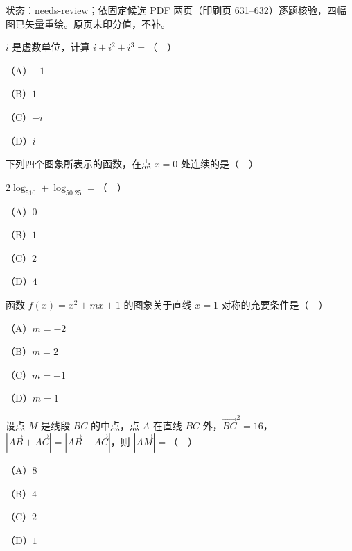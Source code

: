 

状态：needs-review；依固定候选 PDF 两页（印刷页 631–632）逐题核验，四幅图已矢量重绘。原页未印分值，不补。


\begin{question}
$i$ 是虚数单位，计算 $i+i^2+i^3=$（　）

（A）$-1$

（B）$1$

（C）$-i$

（D）$i$

\Needspace{0.4\textheight}
\end{question}
\begingroup
\renewenvironment{question}{\Needspace{0.5\textheight}}{}
\begin{question}
下列四个图象所表示的函数，在点 $x=0$ 处连续的是（　）
\nopagebreak[4]
\begin{center}\end{center}
\nopagebreak[4]
\end{question}
\endgroup
\begin{question}
$2\log_510+\log_50.25=$（　）

（A）$0$

（B）$1$

（C）$2$

（D）$4$

\end{question}
\begin{question}
函数 $f(x)=x^2+mx+1$ 的图象关于直线 $x=1$ 对称的充要条件是（　）

（A）$m=-2$

（B）$m=2$

（C）$m=-1$

（D）$m=1$

\end{question}
\begin{question}
设点 $M$ 是线段 $BC$ 的中点，点 $A$ 在直线 $BC$ 外，$\overrightarrow{BC}^2=16$，$\left|\overrightarrow{AB}+\overrightarrow{AC}\right|=\left|\overrightarrow{AB}-\overrightarrow{AC}\right|$，则 $\left|\overrightarrow{AM}\right|=$（　）

（A）$8$

（B）$4$

（C）$2$

（D）$1$

\end{question}
